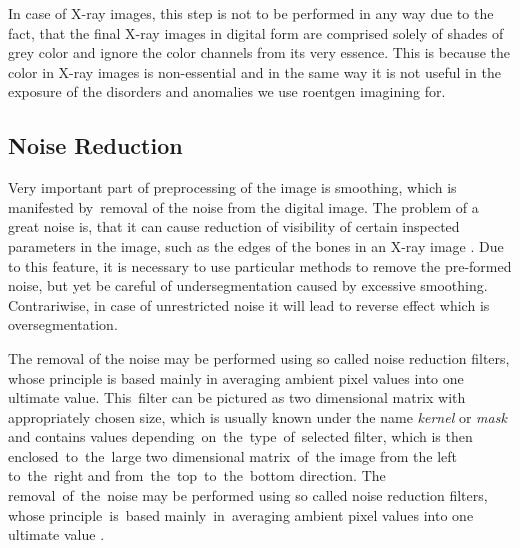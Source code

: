 In case of X-ray images, this step is not to be performed in any way due to the fact, that the final X-ray images in digital form are comprised solely of shades of grey color and ignore the color channels from its very essence. This is because the color in X-ray images is non-essential and in the same way it is not useful in the exposure of the disorders and anomalies we use roentgen imagining for.

\subsection{Noise Reduction}

Very important part of preprocessing of the image is smoothing, which is manifested by~removal of the noise from the digital image. The problem of a great noise is, that it can cause reduction of visibility of certain inspected parameters in the image, such as the edges of the bones in an X-ray image \cite{image-noise}. Due to this feature, it is necessary to use particular methods to remove the pre-formed noise, but yet be careful of undersegmentation caused by excessive
smoothing. Contrariwise, in case of unrestricted noise it will lead to reverse effect which is oversegmentation.

The removal of the noise may be performed using so called noise reduction filters, whose principle is based mainly in averaging ambient pixel values into one ultimate value. This~filter can be pictured as two dimensional matrix with appropriately chosen size, which is usually known under the name \textit{kernel} or \textit{mask} and contains values depending~on~the~type~of~selected filter, which is then enclosed~to~the~large two dimensional matrix~of~the image from the left to~the~right and from~the~top~to~the~bottom direction. The removal~of~the~noise may be performed using so called noise reduction filters, whose principle~is~based mainly~in~averaging ambient pixel values into one ultimate value \cite{image-noise3}.

